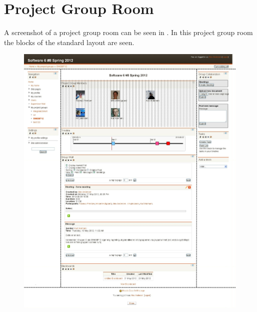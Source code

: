 \section{Project Group Room}
\label{sec:prePgrRom}
A screenshot of a project group room can be seen in . 
In this project group room the blocks of the standard layout are seen.
\begin{figure}[h]
	\centering
		\includegraphics[width=\textwidth]{images/projectgroupwithedit.png}
	\label{fig:projectgroupnoedit}
\end{figure}

